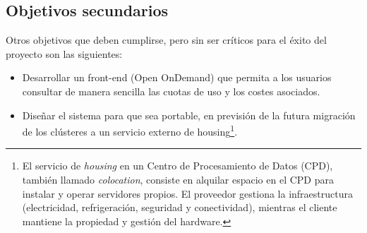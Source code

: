\subsection{Objetivos secundarios}
Otros objetivos que deben cumplirse, pero sin ser críticos para el éxito del proyecto son las siguientes:
\begin{itemize}
    \item Desarrollar un front-end (Open OnDemand) que permita a los usuarios consultar de manera sencilla las cuotas de uso y los costes asociados.
    \item Diseñar el sistema para que sea portable, en previsión de la futura migración de los clústeres a un servicio externo de housing\footnote{El servicio de \textit{housing} en un Centro de Procesamiento de Datos (CPD), también llamado \textit{colocation}, consiste en alquilar espacio en el CPD para instalar y operar servidores propios. El proveedor gestiona la infraestructura (electricidad, refrigeración, seguridad y conectividad), mientras el cliente mantiene la propiedad y gestión del hardware.}.
\end{itemize}